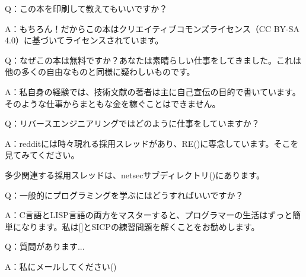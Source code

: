 \par Q：この本を印刷して教えてもいいですか？
\par A：もちろん！だからこの本はクリエイティブコモンズライセンス（CC BY-SA 4.0）に基づいてライセンスされています。

\par Q：なぜこの本は無料ですか？あなたは素晴らしい仕事をしてきました。これは他の多くの自由なものと同様に疑わしいものです。
\par A：私自身の経験では、技術文献の著者は主に自己宣伝の目的で書いています。そのような仕事からまともな金を稼ぐことはできません。

\par Q：リバースエンジニアリングではどのように仕事をしていますか？
\par A：redditには時々現れる採用スレッドがあり、RE\FNURLREDDIT{}(\RedditHiringThread{})に専念しています。そこを見てみてください。

多少関連する採用スレッドは、netsecサブディレクトリ(\NetsecHiringThread{})にあります。

\par Q：一般的にプログラミングを学ぶにはどうすればいいですか？
\par A：C言語とLISP言語の両方をマスターすると、プログラマーの生活はずっと簡単になります。私は[\KRBook]と\ac{SICP}の練習問題を解くことをお勧めします。

\par Q：質問があります...
\par A：私にメールしてください(\EMAIL)
